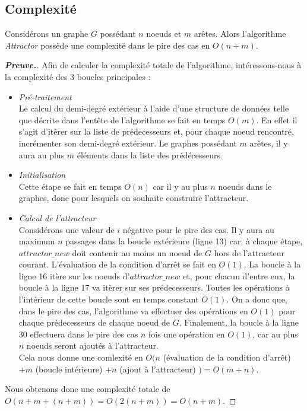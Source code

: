 \documentclass[12pt,a4paper,oneside, titlepage]{report}
\newenvironment{demonstration}{\begin{proof}[\textnormal{\textbf{Preuve.}}]}{\end{proof}}
\begin{document}
\subsection*{Complexité}
Considérons un graphe $G$ possédant $n$ noeuds et $m$ arêtes. Alors l'algorithme \emph{Attractor} possède une complexité dans le pire des cas en $O(n+m)$.
\begin{demonstration}
Afin de calculer la complexité totale de l'algorithme, intéressons-nous à la complexité des 3 boucles principales :
\begin{itemize}
\item \textit{Pré-traitement}\\
Le calcul du demi-degré extérieur à l'aide d'une structure de données telle que décrite dans l'entête de l'algorithme se fait en temps $O(m)$. En effet il s'agit d'itérer sur la liste de prédecesseurs et, pour chaque noeud rencontré, incrémenter son demi-degré extérieur. Le graphes possédant $m$ arêtes, il y aura au plus $m$ éléments dans la liste des prédécesseurs.
\item \textit{Initialisation}\\
Cette étape se fait en temps $O(n)$ car il y au plus $n$ noeuds dans le graphes, donc pour lesquels on souhaite construire l'attracteur.
\item \textit{Calcul de l'attracteur}\\
Considérons une valeur de $i$ négative pour le pire des cas. Il y aura au maximum $n$ passages dans la boucle extérieure (ligne 13) car, à chaque étape, $attractor\_new$ doit contenir au moins un noeud de $G$ hors de l'attracteur courant. L'évaluation de la condition d'arrêt se fait en $O(1)$. La boucle à la ligne 16 itère sur les noeuds d'$attractor\_new$ et, pour chacun d'entre eux, la boucle à la ligne 17 va itèrer sur ses prédecesseurs. Toutes les opérations à l'intérieur de cette boucle sont en temps constant $O(1)$. On a donc que, dans le pire des cas, l'algorithme va effectuer des opérations en $O(1)$ pour chaque prédecesseurs de chaque noeud de $G$. Finalement, la boucle à la ligne 30 effectuera dans le pire des cas $n$ fois une opération en $O(1)$, car au plus $n$ noeuds seront ajoutés à l'attracteur.\\
Cela nous donne une comlexité en $O(n$ (évaluation de la condition d'arrêt) $+m$ (boucle intérieure) $+n$ (ajout à l'attracteur) $) = O(m+n)$.\\
\end{itemize}
Nous obtenons donc une complexité totale de $O(n+m+(n+m)) = O(2(n+m)) = O(n+m)$.
\end{demonstration}
\end{document}
